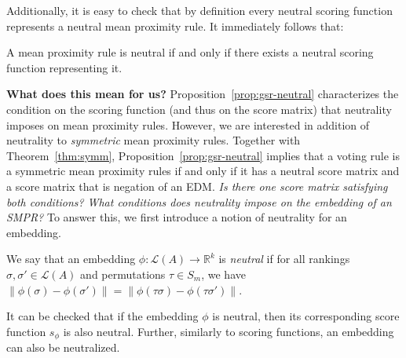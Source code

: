 \documentclass[prodmode,acmec]{ec-acmsmall}
\newcommand{\calL}{{\mathcal{L}}}
\newcommand{\rank}{{\calL(A)}}
\begin{document}
Additionally, it is easy to check that by definition every neutral scoring function represents a neutral mean proximity rule. It immediately follows that:
 
\begin{proposition}
A mean proximity rule is neutral if and only if there exists a neutral scoring function representing it.
\label{prop:gsr-neutral}
\end{proposition}

\noindent \textbf{What does this mean for us?} Proposition~\ref{prop:gsr-neutral} characterizes the condition on the scoring function (and thus on the score matrix) that neutrality imposes on mean proximity rules. However, we are interested in addition of neutrality to \emph{symmetric} mean proximity rules. Together with Theorem~\ref{thm:symm}, Proposition~\ref{prop:gsr-neutral} implies that a voting rule is a symmetric mean proximity rules if and only if it has a neutral score matrix and a score matrix that is negation of an EDM. \emph{Is there one score matrix satisfying both conditions?} \emph{What conditions does neutrality impose on the embedding of an SMPR?} To answer this, we first introduce a notion of neutrality for an embedding.

\begin{definition}
We say that an embedding $\phi:\rank \rightarrow \mathbb{R}^k$ is \emph{neutral} if for all rankings $\sigma,\sigma' \in \rank$ and permutations $\tau \in S_m$, we have $\|\phi(\sigma)-\phi(\sigma')\| = \|\phi(\tau \sigma)-\phi(\tau\sigma')\|$.
\end{definition}

It can be checked that if the embedding $\phi$ is neutral, then its corresponding score function $s_{\phi}$ is also neutral. Further, similarly to scoring functions, an embedding can also be neutralized. 
\end{document}
